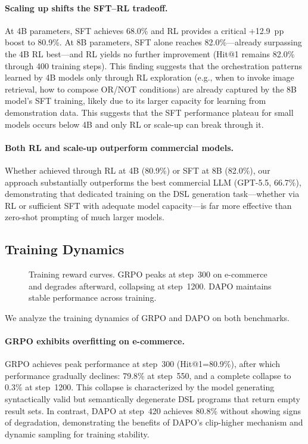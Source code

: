 \paragraph{Scaling up shifts the SFT--RL tradeoff.}
At 4B parameters, SFT achieves 68.0\% and RL provides a critical +12.9~pp boost to 80.9\%. At 8B parameters, SFT alone reaches 82.0\%---already surpassing the 4B RL best---and RL yields no further improvement (Hit@1 remains 82.0\% through 400 training steps).
This finding suggests that the orchestration patterns learned by 4B models only through RL exploration (e.g., when to invoke image retrieval, how to compose OR/NOT conditions) are already captured by the 8B model's SFT training, likely due to its larger capacity for learning from demonstration data.
This suggests that the SFT performance plateau for small models occurs below 4B and only RL or scale-up can break through it.

\paragraph{Both RL and scale-up outperform commercial models.}
Whether achieved through RL at 4B (80.9\%) or SFT at 8B (82.0\%), our approach substantially outperforms the best commercial LLM (GPT-5.5, 66.7\%), demonstrating that dedicated training on the DSL generation task---whether via RL or sufficient SFT with adequate model capacity---is far more effective than zero-shot prompting of much larger models.


\subsection{Training Dynamics}
\label{sec:training}

\begin{figure}[t]
\centering
\caption{Training reward curves. GRPO peaks at step~300 on e-commerce and degrades afterward, collapsing at step~1200. DAPO maintains stable performance across training.}
\label{fig:training_curve}
\end{figure}

We analyze the training dynamics of GRPO and DAPO on both benchmarks.

\paragraph{GRPO exhibits overfitting on e-commerce.}
GRPO achieves peak performance at step~300 (Hit@1=80.9\%), after which performance gradually declines: 79.8\% at step~550, and a complete collapse to 0.3\% at step~1200. This collapse is characterized by the model generating syntactically valid but semantically degenerate DSL programs that return empty result sets. In contrast, DAPO at step~420 achieves 80.8\% without showing signs of degradation, demonstrating the benefits of DAPO's clip-higher mechanism and dynamic sampling for training stability.

